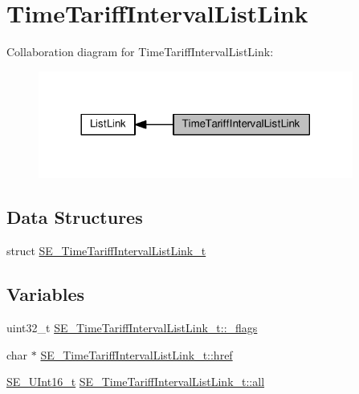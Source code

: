 \hypertarget{group__TimeTariffIntervalListLink}{}\section{Time\+Tariff\+Interval\+List\+Link}
\label{group__TimeTariffIntervalListLink}
Collaboration diagram for Time\+Tariff\+Interval\+List\+Link\+:\nopagebreak
\begin{figure}[H]
\begin{center}
\leavevmode
\includegraphics[width=293pt]{group__TimeTariffIntervalListLink}
\end{center}
\end{figure}
\subsection*{Data Structures}
\begin{DoxyCompactItemize}
\item 
struct \hyperlink{structSE__TimeTariffIntervalListLink__t}{S\+E\+\_\+\+Time\+Tariff\+Interval\+List\+Link\+\_\+t}
\end{DoxyCompactItemize}
\subsection*{Variables}
\begin{DoxyCompactItemize}
\item 
uint32\+\_\+t \hyperlink{group__TimeTariffIntervalListLink_ga2a55ec60c5a306cb112d2d74e49860da}{S\+E\+\_\+\+Time\+Tariff\+Interval\+List\+Link\+\_\+t\+::\+\_\+flags}
\item 
char $\ast$ \hyperlink{group__TimeTariffIntervalListLink_gac4b91b5f652299407cdbb8ba7fe8ccc3}{S\+E\+\_\+\+Time\+Tariff\+Interval\+List\+Link\+\_\+t\+::href}
\item 
\hyperlink{group__UInt16_gac68d541f189538bfd30cfaa712d20d29}{S\+E\+\_\+\+U\+Int16\+\_\+t} \hyperlink{group__TimeTariffIntervalListLink_ga56259e3393d2f64589745a17b0887283}{S\+E\+\_\+\+Time\+Tariff\+Interval\+List\+Link\+\_\+t\+::all}
\end{DoxyCompactItemize}


